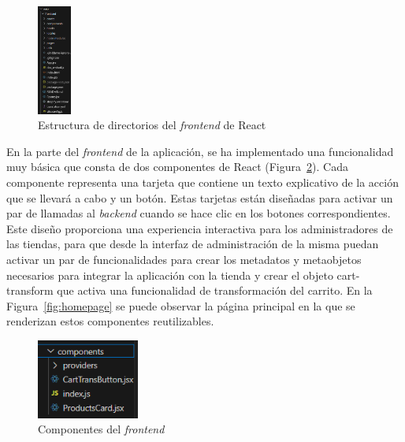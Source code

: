 \documentclass[12pt]{article}
\begin{document}
\begin{figure}[ht]
    \centering
    \includegraphics[width=0.1\textwidth]{imagenes-admin/EstructuraDirectoriosReact.png}
    \caption{\label{fig:estructuraFront} Estructura de directorios del \textit{frontend} de React}
    \vspace{\fill}
\end{figure}

En la parte del \textit{frontend} de la aplicación, se ha implementado una funcionalidad muy básica que consta de dos componentes de React (Figura~\ref{fig:componentes}). Cada componente representa una tarjeta que 
contiene un texto explicativo de la acción que se llevará a cabo y un botón. Estas tarjetas están diseñadas para activar un par de llamadas al \textit{backend} cuando se hace clic en los 
botones correspondientes. Este diseño proporciona una experiencia interactiva para los administradores de las tiendas, para que desde la interfaz de administración de la misma
puedan activar un par de funcionalidades para crear los metadatos y metaobjetos necesarios para integrar la aplicación con la tienda y crear el objeto cart-transform que activa una funcionalidad
de transformación del carrito. En la Figura~\ref{fig:homepage} se puede observar la página principal en la que se renderizan estos componentes reutilizables.

\begin{figure}[ht]
    \centering
    \includegraphics[width=0.3\textwidth]{imagenes-admin/componentes-admin.png}
    \caption{\label{fig:componentes} Componentes del \textit{frontend} }
    \vspace{\fill}
\end{figure}
\end{document}
